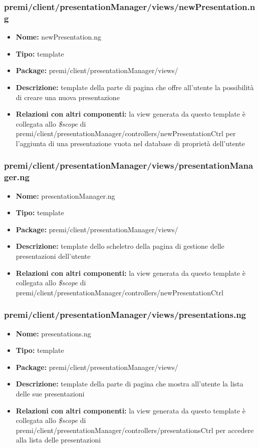 \subsubsection{premi/client/presentationManager/views/newPresentation.ng}
\begin{itemize}
  \item[] \textbf{Nome:} newPresentation.ng
  \item[] \textbf{Tipo:} template
  \item[] \textbf{Package:} premi/client/presentationManager/views/
  \item[] \textbf{Descrizione:} template della parte di pagina che offre all'utente la possibilità di creare una nuova presentazione
  \item[] \textbf{Relazioni con altri componenti:}  la view generata da questo template è collegata allo \textit{\$scope} di premi/client/presentationManager/controllers/newPresentationCtrl per l'aggiunta di una presentazione vuota nel database di proprietà dell'utente
\end{itemize}

\subsubsection{premi/client/presentationManager/views/presentationManager.ng}
\begin{itemize}
  \item[] \textbf{Nome:} presentationManager.ng
  \item[] \textbf{Tipo:} template
  \item[] \textbf{Package:} premi/client/presentationManager/views/
  \item[] \textbf{Descrizione:} template dello scheletro della pagina di gestione delle presentazioni dell'utente
  \item[] \textbf{Relazioni con altri componenti:}  la view generata da questo template è collegata allo \textit{\$scope} di premi/client/presentationManager/controllers/newPresentationCtrl
\end{itemize}

\subsubsection{premi/client/presentationManager/views/presentations.ng}
\begin{itemize}
  \item[] \textbf{Nome:} presentations.ng
  \item[] \textbf{Tipo:} template
  \item[] \textbf{Package:} premi/client/presentationManager/views/
  \item[] \textbf{Descrizione:} template della parte di pagina che mostra all'utente la lista delle sue presentazioni
  \item[] \textbf{Relazioni con altri componenti:} la view generata da questo template è collegata allo \textit{\$scope} di premi/client/presentationManager/controllers/presentationsCtrl per accedere alla lista delle presentazioni
\end{itemize}

